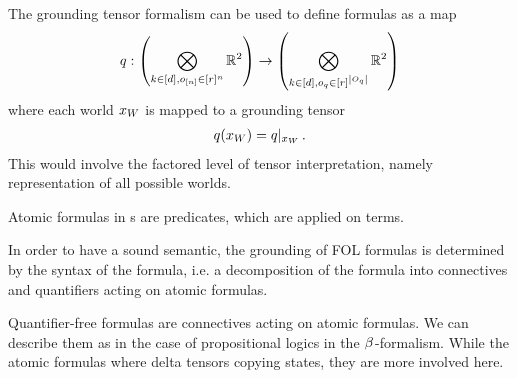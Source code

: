 The grounding tensor formalism can be used to define formulas as a map
\begin{align*}
    q : \left(\bigotimes_{k\in[d],o_{[n]}\in[r]^{n}}\mathbb{R}^{2}\right)
    \rightarrow \left(\bigotimes_{k\in[d],o_{q}\in[r]^{\left|O_{q}\right|}}\mathbb{R}^{2}\right)
\end{align*}
where each world $x_{W}$ is mapped to a grounding tensor
\begin{align*}
    q(x_{W}) = {q}|_{x_{W}} \, .
\end{align*}
This would involve the factored level of tensor interpretation, namely representation of all possible worlds.



Atomic formulas in \firstOrderLogic{}s are predicates, which are applied on terms.





\label{sec:folConnectiveRepresentation}

In order to have a sound semantic, the grounding of FOL formulas is determined by the syntax of the formula, i.e. a decomposition of the formula into connectives and quantifiers acting on atomic formulas.

Quantifier-free formulas are connectives acting on atomic formulas.
We can describe them as in the case of propositional logics in the $\beta^{}$-formalism.
While the atomic formulas where delta tensors copying states, they are more involved here.



